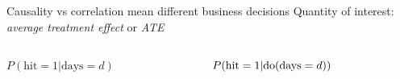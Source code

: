 \begin{frame}{Causality vs correlation mean different business decisions}
    Quantity of interest: \emph{average treatment effect} or \emph{ATE}
    \begin{columns}[T] %
        \begin{column}{.48\textwidth}
            $P(\textrm{hit}=1 | \textrm{days}=d)$\newline

            \newline\newline
        \end{column}%
        \begin{column}{.48\textwidth}
            $P(\textrm{hit}=1 | \mathrm{do}(\textrm{days}=d))$\newline

            \newline \newline
        \end{column}%
    \end{columns}
\end{frame}

